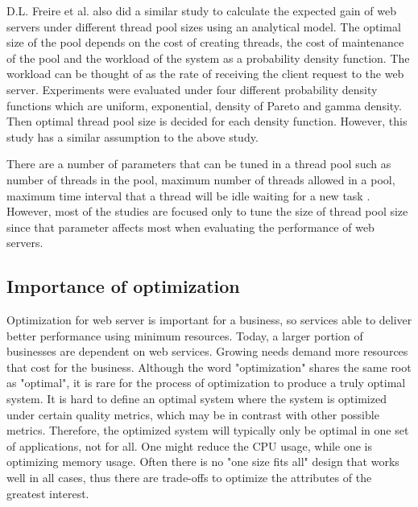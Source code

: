 D.L. Freire et al.\cite{math_aproach_thread_pool_tuning} also did a similar study to calculate the expected gain of web servers under different thread pool sizes using an analytical model. The optimal size of the pool depends on the cost of creating threads, the cost of maintenance of the pool and the workload of the system as a probability density function. The workload can be thought of as the rate of receiving the client request to the web server. Experiments were evaluated under four different probability density functions which are uniform, exponential, density of Pareto and gamma density. Then optimal thread pool size is decided for each density function. However, this study has a similar assumption to the above study. 
 
There are a number of parameters that can be tuned in a thread pool such as number of threads in the pool, maximum number of threads allowed in a pool, maximum time interval that a thread will be idle waiting for a new task \cite{math_aproach_thread_pool_tuning}. However, most of the studies are focused only to tune the size of thread pool size since that parameter affects most when evaluating the performance of web servers.

\subsection{Importance of optimization} 

Optimization for web server is important for a business, so services able to deliver better performance using minimum resources. Today, a larger portion of businesses are dependent on web services. Growing needs demand more resources that cost for the business. Although the word "optimization" shares the same root as "optimal", it is rare for the process of optimization to produce a truly optimal system. It is hard to define an optimal system where the system is optimized under certain quality metrics, which may be in contrast with other possible metrics. Therefore, the optimized system will typically only be optimal in one set of applications, not for all. One might reduce the CPU usage, while one is optimizing memory usage. Often there is no "one size fits all" design that works well in all cases, thus there are trade-offs to optimize the attributes of the greatest interest.

